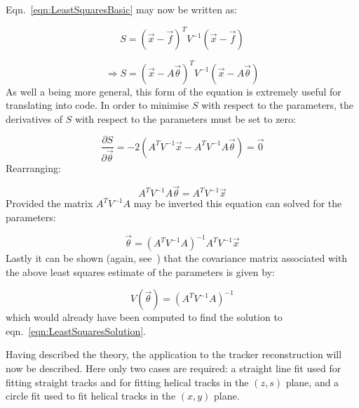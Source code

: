 Eqn.~\ref{eqn:LeastSquaresBasic} may now be written as:

\begin{equation}
  S = \left(\vec{x} - \vec{f} \right)^T V^{-1} \left(\vec{x} - \vec{f} \right)
\end{equation}

\begin{equation}
  \label{eqn:LeastSquaresMatrix}
  \Rightarrow S = \left(\vec{x} - A\vec{\theta} \right)^T V^{-1} \left(\vec{x} - A\vec{\theta} \right)
\end{equation}
As well a being more general, this form of the equation is extremely useful for translating into code. In order to minimise $S$ with respect to the parameters, the derivatives of $S$ with respect to the parameters must be set to zero:

\begin{equation}
  \frac{\partial S}{\partial \vec{\theta}} = -2\left(A^T V^{-1} \vec{x} - A^T V^{-1} A\vec{\theta} \right) = \vec{0}
\end{equation}
Rearranging:

\begin{equation}
  A^T V^{-1} A\vec{\theta} = A^T V^{-1} \vec{x}
\end{equation}
Provided the matrix $A^T V^{-1} A$ may be inverted this equation can solved for the parameters:

\begin{equation}
  \label{eqn:LeastSquaresSolution}
  \vec{\theta} = \left(A^T V^{-1} A \right)^{-1} A^T V^{-1} \vec{x}
\end{equation}
Lastly it can be shown (again, see~\cite{Frodensen}) that the covariance matrix associated with the above least squares estimate of the parameters is given by:

\begin{equation}
  \label{eqn:LeastSquaresSolutionError}
  V(\vec{\theta}) = \left(A^T V^{-1} A \right)^{-1}
\end{equation}
which would already have been computed to find the solution to eqn.~\ref{eqn:LeastSquaresSolution}.

Having described the theory, the application to the tracker reconstruction will now be described.  Here only two cases are required: a straight line fit used for fitting straight tracks and for fitting helical tracks in the $(z, s)$ plane, and a circle fit used to fit helical tracks in the $(x, y)$ plane.

